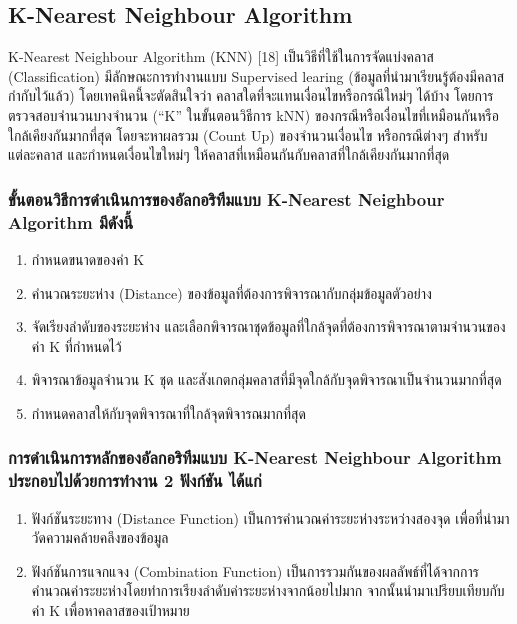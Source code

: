 	\subsection{K-Nearest Neighbour Algorithm }
	K-Nearest Neighbour Algorithm (KNN) [18] เป็นวิธีที่ใช้ในการจัดแบ่งคลาส (Classification) มีลักษณะการทำงานแบบ Supervised learing (ข้อมูลที่นำมาเรียนรู้ต้องมีคลาสกำกับไว้แล้ว) โดยเทคนิคนี้จะตัดสินใจว่า คลาสใดที่จะแทนเงื่อนไขหรือกรณีใหม่ๆ ได้บ้าง โดยการตรวจสอบจำนวนบางจำนวน (“K” ในขั้นตอนวิธีการ kNN) ของกรณีหรือเงื่อนไขที่เหมือนกันหรือใกล้เคียงกันมากที่สุด โดยจะหาผลรวม (Count Up) ของจำนวนเงื่อนไข หรือกรณีต่างๆ สำหรับแต่ละคลาส และกำหนดเงื่อนไขใหม่ๆ ให้คลาสที่เหมือนกันกับคลาสที่ใกล้เคียงกันมากที่สุด
	
	\subsubsection{ขั้นตอนวิธีการดำเนินการของอัลกอริทึมแบบ K-Nearest Neighbour Algorithm มีดังนี้}
	\begin{enumerate}
		\item กำหนดขนาดของค่า K 
		\item คำนวณระยะห่าง (Distance) ของข้อมูลที่ต้องการพิจารณากับกลุ่มข้อมูลตัวอย่าง
		\item จัดเรียงลำดับของระยะห่าง และเลือกพิจารณาชุดข้อมูลที่ใกล้จุดที่ต้องการพิจารณาตามจำนวนของค่า K ที่กำหนดไว้
		\item พิจารณาข้อมูลจำนวน K ชุด และสังเกตกลุ่มคลาสที่มีจุดใกล้กับจุดพิจารณาเป็นจำนวนมากที่สุด
		\item กำหนดคลาสให้กับจุดพิจารณาที่ใกล้จุดพิจารณมากที่สุด
	\end{enumerate}

	\subsubsection{การดำเนินการหลักของอัลกอริทึมแบบ K-Nearest Neighbour Algorithm ประกอบไปด้วยการทำงาน 2 ฟังก์ชัน ได้แก่}

	\begin{enumerate}
		\item ฟังก์ชันระยะทาง (Distance Function) เป็นการคำนวณค่าระยะห่างระหว่างสองจุด เพื่อที่นำมาวัดความคล้ายคลึงของข้อมูล
		\item ฟังก์ชันการแจกแจง (Combination Function) เป็นการรวมกันของผลลัพธ์ที่ได้จากการคำนวณค่าระยะห่างโดยทำการเรียงลำดับค่าระยะห่างจากน้อยไปมาก จากนั้นนำมาเปรียบเทียบกับค่า K เพื่อหาคลาสของเป้าหมาย
	\end{enumerate}

